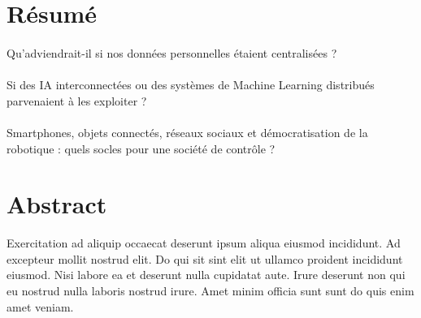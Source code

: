 \section*{Résumé}
\paragraph{} Qu'adviendrait-il si nos données personnelles étaient centralisées ?
\paragraph{} Si des IA interconnectées ou des systèmes de Machine Learning distribués parvenaient à les exploiter ?
\paragraph{} Smartphones, objets connectés, réseaux sociaux et démocratisation de la robotique : quels socles pour une société de contrôle ?


\newpage
\section*{Abstract}
Exercitation ad aliquip occaecat deserunt ipsum aliqua eiusmod incididunt. Ad excepteur mollit nostrud elit. Do qui sit sint elit ut ullamco proident incididunt eiusmod. Nisi labore ea et deserunt nulla cupidatat aute. Irure deserunt non qui eu nostrud nulla laboris nostrud irure. Amet minim officia sunt sunt do quis enim amet veniam.
